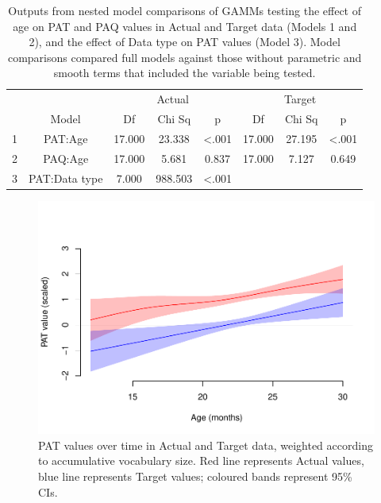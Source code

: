 \documentclass[
  man,mask,floatsintext]{apa6}
\begin{document}
\begin{longtable}[t]{cccccccc}
\caption{\label{tab:table-GAMM-outputs}Outputs from nested model comparisons of GAMMs testing the effect of age on PAT and PAQ values in Actual and Target data (Models 1 and 2), and the effect of Data type on PAT values (Model 3). Model comparisons compared full models against those without parametric and smooth terms that included the variable being tested.}\\
\toprule
\multicolumn{2}{c}{ } & \multicolumn{3}{c}{Actual} & \multicolumn{3}{c}{Target} \\
\cmidrule(l{3pt}r{3pt}){3-5} \cmidrule(l{3pt}r{3pt}){6-8}
  & Model & Df & Chi Sq & p & Df & Chi Sq & p\\
\midrule
1 & PAT:Age & 17.000 & 23.338 & <.001 & 17.000 & 27.195 & <.001\\
2 & PAQ:Age & 17.000 & 5.681 & 0.837 & 17.000 & 7.127 & 0.649\\
3 & PAT:Data type & 7.000 & 988.503 & <.001 &  &  & \\
\bottomrule
\end{longtable}

\begin{figure}
\centering
\includegraphics{PhonNetworksProj-anon_files/figure-latex/figure-GAMM-PAT-1.pdf}
\caption{\label{fig:figure-GAMM-PAT}PAT values over time in Actual and Target data, weighted according to accumulative vocabulary size. Red line represents Actual values, blue line represents Target values; coloured bands represent 95\% CIs.}
\end{figure}
\end{document}
